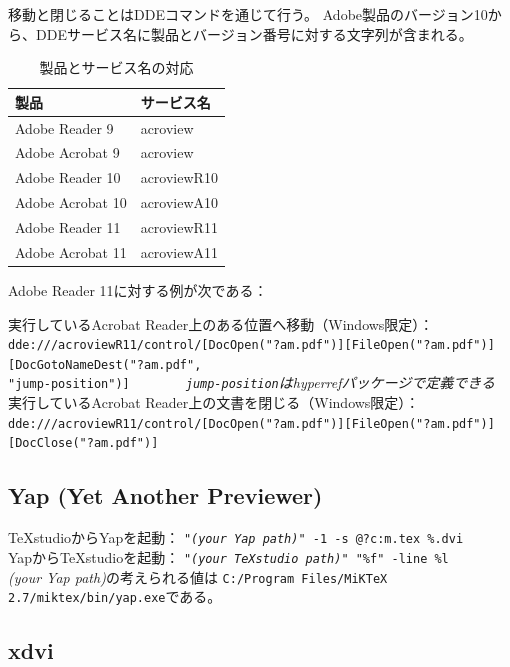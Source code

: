移動と閉じることはDDEコマンドを通じて行う。
Adobe製品のバージョン10から、DDEサービス名に製品とバージョン番号に対する文字列が含まれる。

\begin{table}[H]
  \centering
  \caption{製品とサービス名の対応}
  \begin{tabular}{ll}
    \hline
    \textbf{製品} & \textbf{サービス名}\\
    \hline
    Adobe Reader 9 & acroview\\
    Adobe Acrobat 9 & acroview\\
    Adobe Reader 10 & acroviewR10\\
    Adobe Acrobat 10 & acroviewA10\\
    Adobe Reader 11 & acroviewR11\\
    Adobe Acrobat 11 & acroviewA11\\
    \hline
  \end{tabular}
\end{table}

Adobe Reader 11に対する例が次である：


実行しているAcrobat Reader上のある位置へ移動（Windows限定）：\\
\texttt{dde:///acroviewR11/control/{[}DocOpen("?am.pdf"){]}{[}FileOpen("?am.pdf"){]}{[}DocGotoNameDest("?am.pdf",\\"jump-position"){]}}
~~ ~~ ~~\emph{\texttt{jump-position}はhyperrefパッケージで定義できる}\\


実行しているAcrobat Reader上の文書を閉じる（Windows限定）：\\
\texttt{dde:///acroviewR11/control/{[}DocOpen("?am.pdf"){]}{[}FileOpen("?am.pdf"){]}{[}DocClose("?am.pdf"){]}}

\subsection{Yap (Yet Another Previewer)}

TeXstudioからYapを起動：
 \texttt{"\emph{(your Yap path)}" -1 -s @?c:m.tex \%.dvi}\\

YapからTeXstudioを起動：
 \texttt{"\emph{(your TeXstudio path)}" "\%f" -line \%l}\\

\emph{(your Yap path)}の考えられる値は
\verb+C:/Program Files/MiKTeX 2.7/miktex/bin/yap.exe+である。

\subsection{xdvi}

